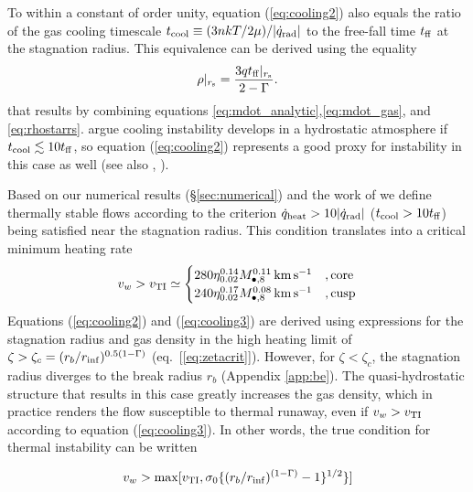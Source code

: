\documentclass[usenatbib,fleqn]{mn2e}
\newcommand{\tff}{t_{\rm ff}}
\begin{document}
To within a constant of order unity, equation (\ref{eq:cooling2}) also
equals the ratio of the gas cooling timescale $t_{\rm cool} \equiv (3n
kT/2 \mu)/|\dot{q}_{\rm rad}|$ to the free-fall time $t_{\rm ff}$ at the
stagnation radius.  This equivalence can be derived using the equality
\begin{align}
\rho|_{r_{\rm s}}=\frac{3 q\tff|_{r_{\rm s}}}{2-\Gamma}.
\label{eq:rhors2}
\end{align}
that results by combining equations
\eqref{eq:mdot_analytic},\eqref{eq:mdot_gas}, and
\eqref{eq:rhostarrs}.  \citet{McCourt+12} argue cooling instability
develops in a hydrostatic atmosphere if $t_{\rm cool} \lesssim 10 t_{\rm ff}$,
so equation (\ref{eq:cooling2}) represents a good proxy for
instability in this case as well (see also \citealt{Li&Bryan14a}, \citealt{Li&Bryan14b}).

Based on our numerical results (\S \ref{sec:numerical}) and the work of \citet{McCourt+12} we define thermally stable flows according to the criterion $\dot{q}_{\rm heat} > 10|\dot{q}_{\rm rad}|$ ($t_{\rm
  cool} > 10t_{\rm ff}$) being satisfied near the stagnation radius.  This condition translates into a
critical minimum heating rate
\begin{align}
v_{w} > v_{\rm TI} \simeq
  \begin{cases}
   280 \eta_{0.02}^{0.14} M_{\bullet,8}^{0.11}\,{\rm km\,s^{-1}}  &, \text{core}\\
   240 \eta_{0.02}^{0.17} M_{\bullet,8}^{0.08}\,{\rm km\,s^{-1}}   &, \text{cusp}  \\
  \end{cases}
  \label{eq:cooling3}
\end{align}
Equations (\ref{eq:cooling2}) and (\ref{eq:cooling3}) are derived
using expressions for the stagnation radius and gas density in the
high heating limit of $\zeta > \zeta_c = (r_{b}/r_{\rm
  inf})^{0.5(1-\Gamma)}$ (eq.~[\ref{eq:zetacrit}]).  However, for
$\zeta < \zeta_c$, the stagnation radius diverges to the break radius
$r_b$ (Appendix \ref{app:be}).  The quasi-hydrostatic structure that
results in this case greatly increases the gas density, which in
practice renders the flow susceptible to thermal runaway, even if
$v_{w} > v_{\rm TI}$ according to equation (\ref{eq:cooling3}).  In
other words, the true condition for thermal instability  can be
written

\begin{equation}
v_w > {\rm max}[v_{\rm TI},\sigma_0\{(r_{b}/r_{\rm
  inf})^{(1-\Gamma)}-1\}^{1/2}\}]
\label{eq:cooling4}
\end{equation}
\end{document}
